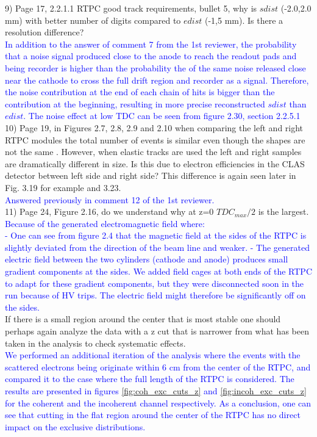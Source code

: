 9) Page 17, 2.2.1.1 RTPC good track requirements, bullet 5, why is $sdist$  
(-2.0,2.0 mm) with better number of digits compared to $edist$ (-1,5 mm).  Is 
there a resolution difference?\\
\textcolor{blue}{
  In addition to the answer of comment 7 from the 1st reviewer, the probability 
that a noise signal produced close to the anode to reach the readout pads and 
being recorder is higher than the probability the of the same noise released 
close near the cathode to cross the full drift region and recorder as a signal.  
Therefore, the noise contribution at the end of each chain of hits is bigger 
than the contribution at the beginning, resulting in more precise reconstructed 
$sdist$ than $edist$. The noise effect at low TDC can be seen from figure 2.30, 
section 2.2.5.1}\\


10) Page 19,  in Figures 2.7, 2.8, 2.9 and 2.10 when comparing the left and right 
RTPC modules the total number of events is similar even though the shapes are 
not the same . However, when elastic tracks are used the left and right samples 
are dramatically different in size. Is this due to electron efficiencies in the 
CLAS detector between left side and right side? This difference is again seen 
later in Fig. 3.19 for example and 3.23.\\
 \textcolor{blue}{ Answered previously in comment 12 of the 1st reviewer.  }\\


11) Page 24, Figure 2.16, do we understand why at z=0 $TDC_{max}/2$ is the 
largest.\\
  \textcolor{blue}{
Because of the generated electromagnetic field where:\\
- One can see from figure 2.4 that the magnetic field at the sides of the RTPC 
is slightly deviated from the direction of the beam line and weaker.
- The generated electric field between the two cylinders (cathode and anode) 
produces small gradient components at the sides. We added field cages at both 
ends of the RTPC to adapt for these gradient components, but they were 
disconnected soon in the run because of HV trips. The electric field might 
therefore be significantly off on the sides. }\\

If there is a small region around the center that is most stable one should 
perhaps again analyze the data with a z cut that is narrower from what has been 
taken in the analysis to check systematic effects.\\
  \textcolor{blue}{ We performed an additional iteration of the analysis where 
  the events with the scattered electrons being originate within 6 cm from the 
  center of the RTPC, and compared it to the case where the full length of the 
  RTPC is considered. The results are presented in figures 
  \ref{fig:coh_exc_cuts_z} and \ref{fig:incoh_exc_cuts_z} for the coherent and 
  the incoherent channel respectively. As a conclusion, one can see that 
  cutting in the flat region around the center of the RTPC has no direct impact 
  on the exclusive distributions. }\\ 
  
